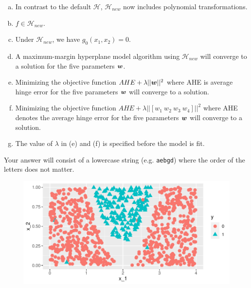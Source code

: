 \documentclass[12pt,landscape]{article}
\newcommand{\instr}{\small Your answer will consist of a lowercase string (e.g. \texttt{aebgd}) where the order of the letters does not matter. \normalsize}
\begin{document}
\begin{enumerate}[(a)]
\item In contrast to the default $\mathcal{H}$, $\mathcal{H}_{new}$ now includes polynomial transformations.
\item $f \in \mathcal{H}_{new}$.
\item Under $\mathcal{H}_{new}$, we have $g_0(x_1,x_2) = 0$.
\item A maximum-margin hyperplane model algorithm using $\mathcal{H}_{new}$ will converge to a solution for the five parameters $\boldsymbol{w}$.
\item Minimizing the objective function $AHE + \lambda || \boldsymbol{w} ||^2$ where AHE is average hinge error for the five parameters $\boldsymbol{w}$ will converge to a solution.
\item Minimizing the objective function $AHE + \lambda|| [w_1~w_2~w_3~w_4] ||^2$ where AHE denotes the average hinge error for the five parameters $\boldsymbol{w}$ will converge to a solution.
\item The value of $\lambda$ in (e) and (f) is  specified before the model is fit.
\end{enumerate}
\eenum\instr\pagebreak


\problem{}  

\vspace{-0.4cm}
\begin{figure}[htp]
\centering
\includegraphics[width = 6in]{binary.pdf}\vspace{-0.4cm}
\end{figure}

\vspace{-0.4cm}\benum{} 
\end{document}
